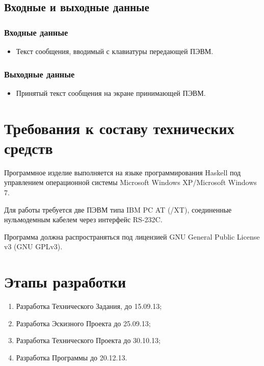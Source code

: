 \documentclass[14pt]{extarticle}
\begin{document}
\subsection{Входные и выходные данные}
\subsubsection{Входные данные}
\begin{itemize}
\item Текст сообщения, вводимый с клавиатуры передающей ПЭВМ.
\end{itemize}

\subsubsection{Выходные данные}
\begin{itemize}
\item Принятый текст сообщения на экране принимающей ПЭВМ.
\end{itemize}
\clearpage

\section{Требования к составу технических средств}
Программное изделие выполняется на языке программирования Haskell под управлением операционной системы Microsoft Windows XP/Microsoft Windows 7.

Для работы требуется две ПЭВМ типа IBM PC AT (/XT), соединенные нульмодемным кабелем через интерфейс RS-232C.

Программа должна распространяться под лицензией GNU General Public License v3 (GNU GPLv3).

\section{Этапы разработки}
\begin{enumerate}
\item Разработка Технического Задания, до 15.09.13;
\item Разработка Эскизного Проекта до 25.09.13;
\item Разработка Технического Проекта до 30.10.13;
\item Разработка Программы до 20.12.13.
\end{enumerate}
\end{document}
